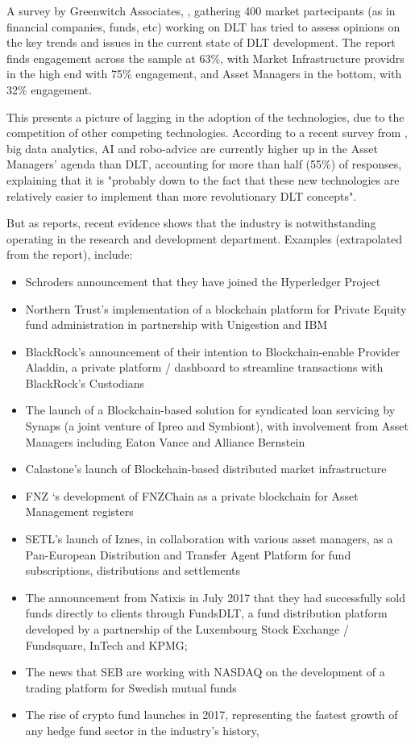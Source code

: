 A survey by Greenwitch Associates, \cite{greenwitchdltreport}, gathering 400 market partecipants (as in financial companies, funds, etc) working on DLT has tried to assess opinions on the key trends and issues in the current state of DLT development. The report finds engagement across the sample at 63\%, with Market Infrastructure providrs in the high end with 75\% engagement, and Asset Managers in the bottom, with 32\% engagement.

This presents a picture of lagging in the adoption of the technologies, due to the competition of other competing technologies. According to a recent survey from \cite{multifundssurvey}, big data analytics, AI and robo-advice are currently higher up in the Asset Managers' agenda than DLT, accounting for more than half (55\%) of responses, explaining that it is "probably down to the fact that these new technologies are relatively easier to implement than more revolutionary DLT concepts". 

But as \cite{ibmdltreport} reports, recent evidence shows that the industry is notwithstanding operating in the research and development department. 
Examples (extrapolated from the report), include:

\begin{itemize}
    \item Schroders announcement that they have joined the Hyperledger Project
    \item Northern Trust’s implementation of a blockchain platform for Private Equity fund administration in partnership with Unigestion and IBM
    \item BlackRock’s announcement of their intention to Blockchain-enable Provider Aladdin, a private platform / dashboard to streamline transactions with BlackRock’s Custodians
    \item The launch of a Blockchain-based solution for syndicated loan servicing by Synaps (a joint venture of Ipreo and Symbiont), with involvement from Asset Managers including Eaton Vance and Alliance Bernstein
    \item Calastone’s launch of Blockchain-based distributed market infrastructure
    \item FNZ ‘s development of FNZChain as a private blockchain for Asset Management registers
    \item SETL’s launch of Iznes, in collaboration with various asset managers, as a Pan-European Distribution and Transfer Agent Platform for fund subscriptions, distributions and
    settlements
    \item The announcement from Natixis in July 2017 that they had successfully sold funds directly to clients through FundsDLT, a fund distribution platform developed by a partnership of the Luxembourg Stock Exchange / Fundsquare, InTech and KPMG;
    \item The news that SEB are working with NASDAQ on the development of a trading platform for Swedish mutual funds
    \item The rise of crypto fund launches in 2017, representing the fastest growth of any hedge fund sector in the industry’s history, \cite{hedgefundcryptoreport}
\end{itemize}
\clearpage


